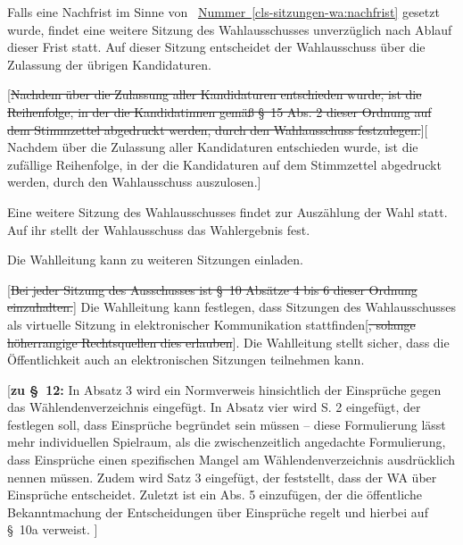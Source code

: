 \documentclass[%
draft,%
multilinesections%
]{fswo}
\newcommand\oldT[1]  {{\color{Gray}[\st{#1}]}}
\newcommand\newT[1]  {{\color{Green}[#1]}}
\newcommand\bemFr[1] {{\color{Red}[#1]}}
\newcommand\oldT[1]{}%
\newcommand\newT[1]{#1}
\newcommand\bemFr[1]{}%
\newcommand\change[2]{\oldT{#1}\newT{#2}}
\newcommand*{\refItem}[1]{\hyperref[#1]{Nummer~\ref{#1}}}
\begin{document}
\begin{contract}
Falls eine Nachfrist im Sinne von ~\refItem{cls-sitzungen-wa:nachfrist} gesetzt wurde, findet eine weitere Sitzung des Wahlausschusses unverzüglich nach Ablauf dieser Frist statt.
Auf dieser Sitzung entscheidet der Wahlausschuss über die Zulassung der übrigen Kandidaturen.
\label{cls-sitzungen-wa:abs-beschluesse-nachfristende}

\change{Nachdem über die Zulassung aller Kandidaturen entschieden wurde, ist die Reihenfolge, in der die Kandidatinnen gemäß \S~15 Abs. 2 dieser Ordnung auf dem Stimmzettel abgedruckt werden, durch den Wahlausschuss festzulegen.}{%
Nachdem über die Zulassung aller Kandidaturen entschieden wurde, ist die zufällige Reihenfolge, in der die Kandidaturen auf dem Stimmzettel abgedruckt werden, durch den Wahlausschuss auszulosen.}

Eine weitere Sitzung des Wahlausschusses findet zur Auszählung der Wahl statt. Auf ihr stellt der Wahlausschuss das Wahlergebnis fest.

Die Wahlleitung kann zu weiteren Sitzungen einladen.

\oldT{Bei jeder Sitzung des Ausschusses ist \S~10 Absätze 4 bis 6 dieser Ordnung einzuhalten.}
Die Wahlleitung kann festlegen, dass Sitzungen des Wahlausschusses als virtuelle Sitzung in elektronischer Kommunikation stattfinden\oldT{, solange höherrangige Rechtsquellen dies erlauben}.
Die Wahlleitung stellt sicher, dass die Öffentlichkeit auch an elektronischen Sitzungen teilnehmen kann.
\end{contract}

\bemFr{\textbf{zu \S~12:}
In Absatz 3 wird ein Normverweis hinsichtlich der Einsprüche gegen das Wählendenverzeichnis eingefügt.
In Absatz vier wird S. 2 eingefügt, der festlegen soll, dass Einsprüche begründet sein müssen
– diese Formulierung lässt mehr individuellen Spielraum, als die zwischenzeitlich angedachte Formulierung,
dass Einsprüche einen spezifischen Mangel am Wählendenverzeichnis ausdrücklich nennen müssen.
Zudem wird Satz 3 eingefügt, der feststellt, dass der WA über Einsprüche entscheidet.
Zuletzt ist ein Abs. 5 einzufügen, der die öffentliche Bekanntmachung der Entscheidungen über Einsprüche regelt und hierbei auf \S~10a verweist.
}
\end{document}
